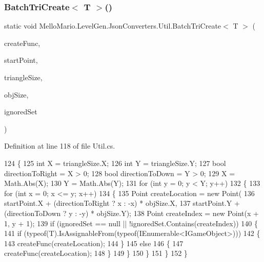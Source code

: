 \subsubsection{Batch\+Tri\+Create$<$ T $>$()}
{\footnotesize\ttfamily static void Mello\+Mario.\+Level\+Gen.\+Json\+Converters.\+Util.\+Batch\+Tri\+Create$<$ T $>$ (\begin{DoxyParamCaption}\item[{Func$<$ Point, T $>$}]{create\+Func,  }\item[{Point}]{start\+Point,  }\item[{Point}]{triangle\+Size,  }\item[{Point}]{obj\+Size,  }\item[{I\+Collection$<$ Point $>$}]{ignored\+Set }\end{DoxyParamCaption})\hspace{0.3cm}{\ttfamily [static]}}



Definition at line 118 of file Util.\+cs.


\begin{DoxyCode}
124         \{
125             \textcolor{keywordtype}{int} X = triangleSize.X;
126             \textcolor{keywordtype}{int} Y = triangleSize.Y;
127             \textcolor{keywordtype}{bool} directionToRight = X > 0;
128             \textcolor{keywordtype}{bool} directionToDown = Y > 0;
129             X = Math.Abs(X);
130             Y = Math.Abs(Y);
131             \textcolor{keywordflow}{for} (\textcolor{keywordtype}{int} y = 0; y < Y; y++)
132             \{
133                 \textcolor{keywordflow}{for} (\textcolor{keywordtype}{int} x = 0; x <= y; x++)
134                 \{
135                     Point createLocation = \textcolor{keyword}{new} Point(
136                         startPoint.X + (directionToRight ? x : -x) * objSize.X,
137                         startPoint.Y + (directionToDown ? y : -y) * objSize.Y);
138                     Point createIndex = \textcolor{keyword}{new} Point(x + 1, y + 1);
139                     \textcolor{keywordflow}{if} (ignoredSet == null || !ignoredSet.Contains(createIndex))
140                     \{
141                         \textcolor{keywordflow}{if} (typeof(T).IsAssignableFrom(typeof(IEnumerable<IGameObject>)))
142                         \{
143                             createFunc(createLocation);
144                         \}
145                         \textcolor{keywordflow}{else}
146                         \{
147                             createFunc(createLocation);
148                         \}
149                     \}
150                 \}
151             \}
152         \}
\end{DoxyCode}
\mbox{\label{classMelloMario_1_1LevelGen_1_1JsonConverters_1_1Util_af87c2b204c27e1c032984b7606d38057}} 
